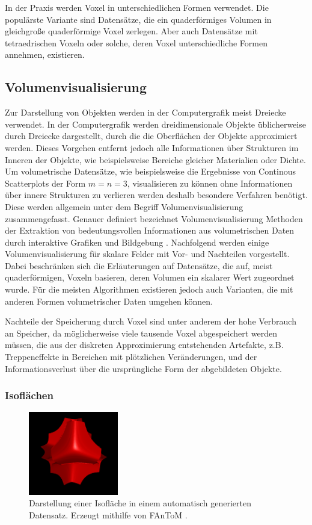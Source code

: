 \documentclass[a4paper,fontsize=12pt,toc=bib,parskip=half,ngerman]{scrartcl}
\begin{document}
In der Praxis werden Voxel in unterschiedlichen Formen verwendet. Die popul\"arste Variante sind Datens\"atze, die ein quaderf\"ormiges Volumen in gleichgro{\ss}e quaderf\"ormige Voxel zerlegen. Aber auch Datens\"atze mit tetraedrischen Voxeln oder solche, deren Voxel unterschiedliche Formen annehmen, existieren.

\subsection{Volumenvisualisierung}
Zur Darstellung von Objekten werden in der Computergrafik meist Dreiecke verwendet. 
In der Computergrafik werden dreidimensionale Objekte \"ublicherweise durch Dreiecke dargestellt, durch die die Oberfl\"achen der Objekte approximiert werden. Dieses Vorgehen entfernt jedoch alle Informationen \"uber Strukturen im Inneren der Objekte, wie beispielsweise Bereiche gleicher Materialien oder Dichte. Um volumetrische Datens\"atze, wie beispielsweise die Ergebnisse von Continous Scatterplots der Form $m=n=3$, visualisieren zu k\"onnen ohne Informationen \"uber innere Strukturen zu verlieren werden deshalb besondere Verfahren ben\"otigt. Diese werden allgemein unter dem Begriff \glq Volumenvisualisierung\grq{} zusammengefasst. Genauer definiert bezeichnet Volumenvisualisierung Methoden der Extraktion von bedeutungsvollen Informationen aus volumetrischen Daten durch interaktive Grafiken und Bildgebung \cite[S.~127]{hansen2005visualization}. Nachfolgend werden einige Volumenvisualisierung f\"ur skalare Felder  mit Vor- und Nachteilen vorgestellt. Dabei beschr\"anken sich die Erl\"auterungen auf Datens\"atze, die auf, meist quaderf\"ormigen, Voxeln basieren, deren Volumen ein skalarer Wert zugeordnet wurde. F\"ur die meisten Algorithmen existieren jedoch auch Varianten, die mit anderen Formen volumetrischer Daten umgehen k\"onnen.

Nachteile der Speicherung durch Voxel sind unter anderem der hohe Verbrauch an Speicher, da m\"oglicherweise viele tausende Voxel abgespeichert werden m\"ussen, die aus der diskreten Approximierung entstehenden Artefakte, z.B. Treppeneffekte in Bereichen mit pl\"otzlichen Ver\"anderungen, und der Informationsverlust \"uber die urspr\"ungliche Form der abgebildeten Objekte.

\subsubsection{Isofl\"achen}
\begin{figure}
		\centering
		\includegraphics[width=0.35\textwidth]{pictures/isosurface.png}
		\caption{Darstellung einer Isofl\"ache in einem automatisch generierten Datensatz. Erzeugt mithilfe von FAnToM \cite{fantomWebsite}.} 
		\label{Isosurface}
\end{figure}
\end{document}
